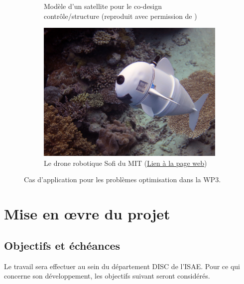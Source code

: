 \documentclass[12pt, french]{article}
\begin{document}
\begin{figure}[t]
\begin{subfigure}[t]{0.3\textwidth}
		\caption{Modèle d'un satellite pour le co-design contrôle/structure (reproduit avec permission de \cite{finozzi2022sub})}
		\label{fig:codesign_sat}
	\end{subfigure}\hfill
	\begin{subfigure}[t]{0.35\textwidth}
		\includegraphics[width=\columnwidth]{Sofi_MIT.jpeg}%
		\caption{Le drone robotique Sofi du MIT (\href{https://www.csail.mit.edu/research/sofi-soft-robotic-fish}{Lien à la page web})}
		\label{fig:sofi-mit}
	\end{subfigure}
	\caption[]{Cas d'application pour les problèmes optimisation dans la WP3.}%
	\label{fig:optmisation}%
\end{figure}


\section{Mise en \oe{}vre du projet}

\subsection{Objectifs et échéances}

Le travail sera effectuer au sein du département DISC de l'ISAE. Pour ce qui concerne son développement, les objectifs suivant seront considérés.
\end{document}
